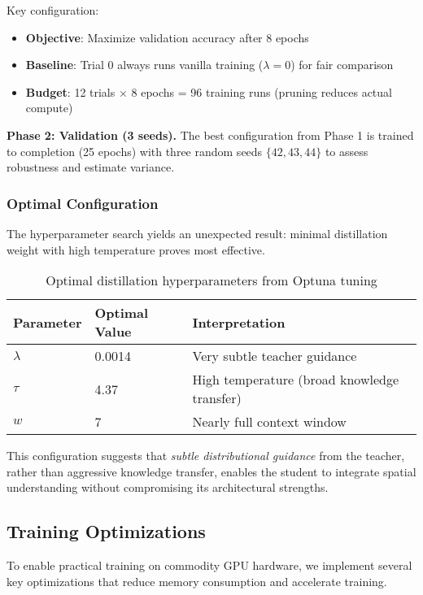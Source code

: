 Key configuration:
\begin{itemize}[noitemsep,topsep=0pt]
\item \textbf{Objective}: Maximize validation accuracy after 8 epochs
\item \textbf{Baseline}: Trial 0 always runs vanilla training ($\lambda = 0$) for fair comparison
\item \textbf{Budget}: 12 trials $\times$ 8 epochs = 96 training runs (pruning reduces actual compute)
\end{itemize}

\textbf{Phase 2: Validation (3 seeds).} The best configuration from Phase 1 is trained to completion (25 epochs) with three random seeds $\{42, 43, 44\}$ to assess robustness and estimate variance.

\subsubsection{Optimal Configuration}

The hyperparameter search yields an unexpected result: minimal distillation weight with high temperature proves most effective.

\begin{table}[h]
\centering
\caption{Optimal distillation hyperparameters from Optuna tuning}
\label{tab:optimal-hparams}
\small
\begin{tabular}{lll}
\toprule
\textbf{Parameter} & \textbf{Optimal Value} & \textbf{Interpretation} \\
\midrule
$\lambda$ & 0.0014 & Very subtle teacher guidance \\
$\tau$ & 4.37 & High temperature (broad knowledge transfer) \\
$w$ & 7 & Nearly full context window \\
\bottomrule
\end{tabular}
\end{table}

This configuration suggests that \emph{subtle distributional guidance} from the teacher, rather than aggressive knowledge transfer, enables the student to integrate spatial understanding without compromising its architectural strengths.

\subsection{Training Optimizations}
\label{sec:impl-opt}

To enable practical training on commodity GPU hardware, we implement several key optimizations that reduce memory consumption and accelerate training.

